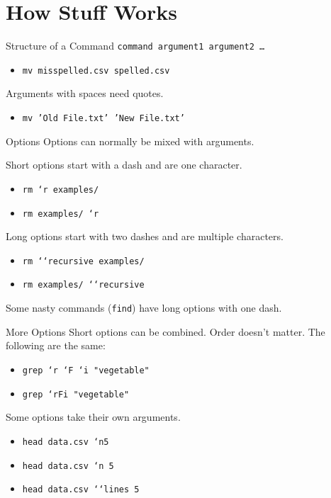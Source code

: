 \documentclass[pdf,usenames,dvipsnames,14pt]{beamer}%
\newcommand\hyphen{\char`\-}
\begin{document}
\section{How Stuff Works}

\begin{frame}{Structure of a Command}
	\texttt{command argument1 argument2 \dots}
	\begin{itemize}
		\item \texttt{mv misspelled.csv spelled.csv}
	\end{itemize}
	
	Arguments with spaces need quotes.
	\begin{itemize}
		\item \texttt{mv 'Old File.txt' 'New File.txt'}
	\end{itemize}
\end{frame}

\begin{frame}{Options}
	Options can normally be mixed with arguments.
	
	Short options start with a dash and are one character.
	\begin{itemize}
		\item \texttt{rm \hyphen r examples/}
		\item \texttt{rm examples/ \hyphen r}
	\end{itemize}
	
	Long options start with two dashes and are multiple characters.
	\begin{itemize}
		\item \texttt{rm \hyphen\hyphen recursive examples/}
		\item \texttt{rm examples/ \hyphen\hyphen recursive}
	\end{itemize}
	
	Some nasty commands (\texttt{find}) have long options with one dash.
\end{frame}

\begin{frame}{More Options}
	Short options can be combined.
	Order doesn't matter.
	The following are the same:
	\begin{itemize}
		\item \texttt{grep \hyphen r \hyphen F \hyphen i "vegetable"}
		\item \texttt{grep \hyphen rFi "vegetable"}
	\end{itemize}
	Some options take their own arguments.
	\begin{itemize}
		\item \texttt{head data.csv \hyphen n5}
		\item \texttt{head data.csv \hyphen n 5}
		\item \texttt{head data.csv \hyphen\hyphen lines 5}
	\end{itemize}
\end{frame}
\end{document}
